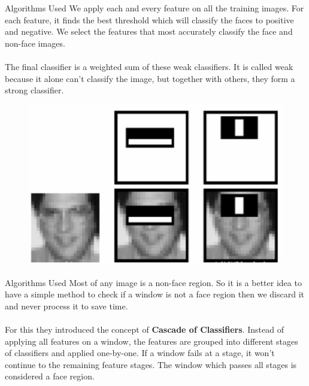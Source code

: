 \documentclass[10pt]{beamer}
\begin{document}
\begin{frame}{Algorithms Used}
We apply each and every feature on all the training images. For each feature, it finds the best threshold which will classify the faces to positive and negative. We select the features that most accurately classify the face and non-face images. \\~\\

The final classifier is a weighted sum of these weak classifiers. It is called weak because it alone can't classify the image, but together with others, they form a strong classifier.

\begin{figure}
\vspace*{0cm}
\hspace*{0cm}
\includegraphics[scale=0.25]{images/kernel2}
\end{figure}
\end{frame}


\begin{frame}{Algorithms Used}
Most of any image is a non-face region. So it is a better idea to have a simple method to check if a window is not a face region then we discard it and never process it to save time. \\~\\

For this they introduced the concept of \textbf{Cascade of Classifiers}. Instead of applying all features on a window, the features are grouped into different stages of classifiers and applied one-by-one. If a window fails at a stage, it won't continue to the remaining feature stages. The window which passes all stages is considered a face region.
\end{frame}
\end{document}

